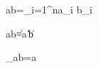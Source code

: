 \mathbf a\cdot\mathbf b=\sum_{i=1}^{n}a_i b_i

\mathbf a\cdot\mathbf b=\|\mathbf a\|\,\|\mathbf b\|\cos\theta

_{\mathbf a}\mathbf b=\mathbf a

